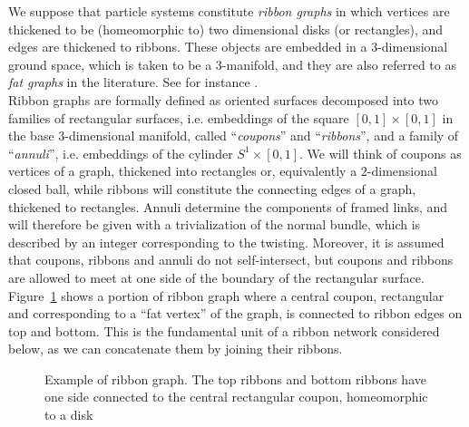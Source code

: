 \documentclass[aps,nofootinbib,amsfonts,superscriptaddress]{revtex4}
\begin{document}
We suppose that particle systems constitute {\it ribbon graphs} in which vertices are thickened to be (homeomorphic to) two dimensional disks (or rectangles), and edges are thickened to ribbons. These objects are embedded in a 3-dimensional ground space, which is taken to be a 3-manifold, and they are also referred to as {\it fat graphs} in the literature. See for instance \cite{Igusa,MP}.   \\

Ribbon graphs are formally defined as oriented surfaces decomposed into two families of rectangular surfaces, i.e. embeddings of the square $[0,1]\times [0,1]$ in the base 3-dimensional manifold, called ``{\it coupons}'' and ``{\it ribbons}'', and a family of ``{\it annuli}'', i.e. embeddings of the cylinder $S^1\times [0,1]$. We will think of coupons as vertices of a graph, thickened into rectangles or, equivalently a $2$-dimensional closed ball, while ribbons will constitute the connecting edges of a graph, thickened to rectangles. Annuli determine the components of framed links, and will therefore be given with a trivialization of the normal bundle, which is described by an integer corresponding to the twisting. Moreover, it is assumed that coupons, ribbons and annuli do not self-intersect, but coupons and ribbons are allowed to meet at one side of the boundary of the rectangular surface. Figure~\ref{fig:ribbongraph} shows a portion of ribbon graph where a central coupon, rectangular and corresponding to a ``fat vertex'' of the graph, is connected to ribbon edges on top and bottom. This is the fundamental unit of a ribbon network considered below, as we can concatenate them by joining their ribbons. \\

\begin{figure}
    \centering
    \caption{Example of ribbon graph. The top ribbons and bottom ribbons have one side connected to the central rectangular coupon, homeomorphic to a disk}
    \label{fig:ribbongraph}
\end{figure}
\end{document}
